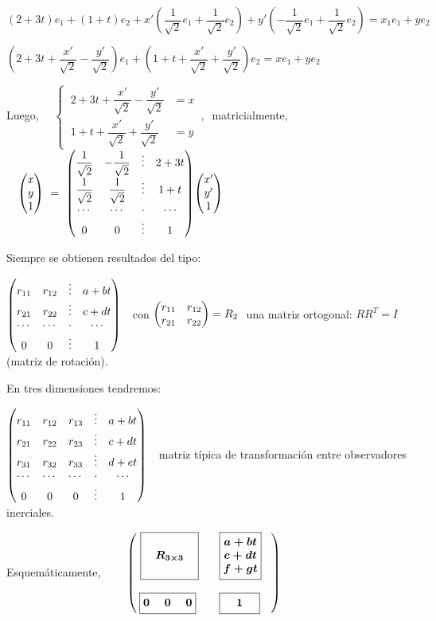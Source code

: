 $(2+3t)e_1+(1+t)e_2+x'\left( \dfrac 1{\sqrt{2}} e_1 + \dfrac 1{\sqrt{2}} e_2 \right) + y' \left( -\dfrac 1{\sqrt{2}} e_1 + \dfrac 1{\sqrt{2}} e_2 \right)=x_1e_1+ye_2$

$\left(2+3t+\dfrac{x'}{\sqrt{2}}-\dfrac{y'}{\sqrt{2}} \right) e_1 +
\left(1+t+\dfrac{x'}{\sqrt{2}}+\dfrac{y'}{\sqrt{2}} \right) e_2 =xe_1+ye_2$

Luego, $\quad \begin{cases}
 \ 	2+3t+\dfrac{x'}{\sqrt{2}}-\dfrac{y'}{\sqrt{2}} &=x\\
 \ 	1+t+\dfrac{x'}{\sqrt{2}}+\dfrac{y'}{\sqrt{2}} &=y
 \end{cases}\, , \ $ matricialmente,
  $\quad \mqty(x\\y\\1) \ = \ \mqty(
 \dfrac 1{\sqrt{2}} &  -\dfrac 1{\sqrt{2}} & \vdots & 2+3t \\
  \dfrac 1{\sqrt{2}}&   \dfrac 1{\sqrt{2}} & \vdots & 1+t \\
  \cdots & \cdots & \cdot & \cdots \\
  0&0&\vdots &1
 ) \mqty(x'\\y'\\1)$

Siempre se obtienen resultados del tipo:

$\mqty(
r_{11}&r_{12}&\vdots&a+bt\\
r_{21}&r_{22}&\vdots&c+dt\\
\cdots &\cdots&\cdot&\cdots\\
0&0&\vdots&1
)\ \ $ con $\mqty(r_{11}&r_{12}\\r_{21}&r_{22})=R_2\ $ una matriz ortogonal: $RR^T=I$ (matriz de rotación).

En tres dimensiones tendremos:


$\mqty(
r_{11}&r_{12}&r_{13}&\vdots&a+bt\\
r_{21}&r_{22}&r_{23}&\vdots&c+dt\\
r_{31}&r_{32}&r_{33}&\vdots&d+et\\
\cdots &\cdots&\cdots&\cdot&\cdots\\
0&0&0&\vdots&1)\ \ $ matriz típica de transformación entre observadores inerciales.


Esquemáticamente, \hspace{2cm} $\qquad \boldsymbol{
\mqty(\ 
\boxed{ \mqty{ \\ & R_{3\times 3} & \\  \\ } } & \boxed{\mqty{ a+bt\\c+dt\\f+gt}} \\ \\
\boxed{\mqty{ 0&\ 0 \ &0 }} & \ \ \,  \boxed{\mqty{\,  &1&}\, }
\ \ \ )
}$


